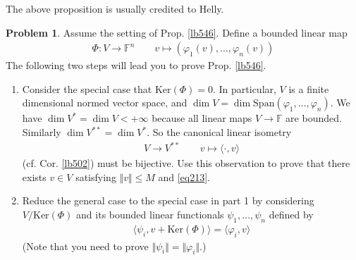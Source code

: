 \documentclass[12pt,b5paper,notitlepage]{article}
\theoremstyle{definition}
\newtheorem{prob}{\color{red}Problem}[section]
\theoremstyle{plain}
\newcommand{\Span}{\mathrm{Span}}
\newcommand{\bk}[1]{\langle {#1}\rangle}
\newcommand{\Ker}{\mathrm{Ker}}
\newcommand{\Fbb}{\mathbb F}
\numberwithin{equation}{section}
\begin{document}
The above proposition is usually credited to Helly.

\begin{prob}\label{lb547}
Assume the setting of Prop. \ref{lb546}. Define a bounded linear map
\begin{gather}\label{eq214}
\Phi:V\rightarrow \Fbb^n\qquad v\mapsto(\varphi_1(v),\dots,\varphi_n(v))
\end{gather}
The following two steps will lead you to prove Prop. \ref{lb546}.
\begin{enumerate}
\item Consider the special case that $\Ker(\Phi)=0$. In particular, $V$ is a finite dimensional normed vector space, and $\dim V=\dim\Span(\varphi_1,\dots,\varphi_n)$. We have $\dim V^*=\dim V<+\infty$ because all linear maps $V\rightarrow\Fbb$ are bounded. Similarly $\dim V^{**}=\dim V^*$. So the canonical linear isometry
\begin{gather}
V\rightarrow V^{**}\qquad v\mapsto \bk{\cdot,v}
\end{gather}
(cf. Cor. \ref{lb502}) must be bijective. Use this observation to prove that there exists $v\in V$ satisfying $\Vert v\Vert\leq M$ and \eqref{eq213}.

\item Reduce the general case to the special case in part 1 by considering $V/\Ker(\Phi)$ and its bounded linear functionals $\psi_1,\dots,\psi_n$ defined by
\begin{align}
\bk{\psi_i,v+\Ker(\Phi)}=\bk{\varphi_i,v}
\end{align}
(Note that you need to prove $\Vert\psi_i\Vert=\Vert\varphi_i\Vert$.)
\end{enumerate}
\end{prob}
\end{document}
